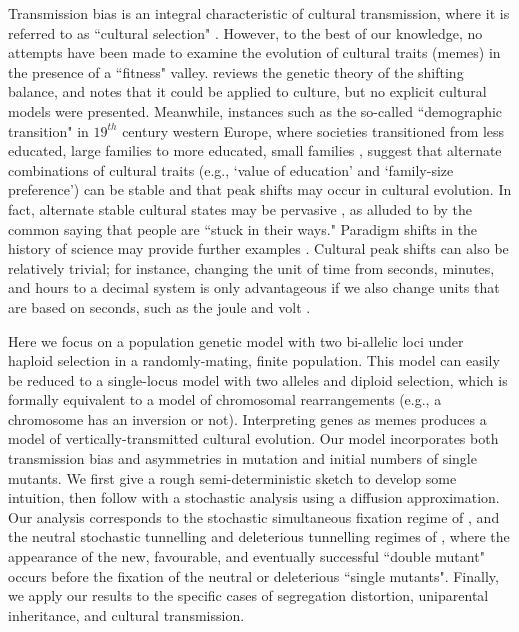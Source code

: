 \documentclass[review,3p,authoryear]{elsarticle}
\begin{document}
 Transmission bias is an integral characteristic of cultural transmission, where it is referred to as ``cultural selection" \citep{CavalliSforza1981,Boyd1985}.
However, to the best of our knowledge, no attempts have been made to examine the evolution of cultural traits (memes) in the presence of a ``fitness" valley.
\cite{Boyd2001} reviews the genetic theory of the shifting balance, and notes that it could be applied to culture, but no explicit cultural models were presented.
Meanwhile, instances such as the so-called ``demographic transition" in $19^{th}$ century western Europe, where societies transitioned from less educated, large families to more educated, small families \citep{Mulder1998}, suggest that alternate combinations of cultural traits (e.g., `value of education' and `family-size preference') can be stable and that peak shifts may occur in cultural evolution.
In fact, alternate stable cultural states may be pervasive \citep{Boyd2010}, as alluded to by the common saying that people are ``stuck in their ways."
Paradigm shifts in the history of science \citep{Kuhn1962} may provide further examples \citep{Fog1999}.
Cultural peak shifts can also be relatively trivial; for instance, changing the unit of time from seconds, minutes, and hours to a decimal system is only advantageous if we also change units that are based on seconds, such as the joule and volt \citep{Fog1999}.     

Here we focus on a population genetic model with two bi-allelic loci under haploid selection in a randomly-mating, finite population.
This model can easily be reduced to a single-locus model with two alleles and diploid selection, which is formally equivalent to a model of chromosomal rearrangements (e.g., a chromosome has an inversion or not).
Interpreting genes as memes produces a model of vertically-transmitted cultural evolution.
Our model incorporates both transmission bias and asymmetries in mutation and initial numbers of single mutants.
We first give a rough semi-deterministic sketch to develop some intuition, then follow with a stochastic analysis using a diffusion approximation.
Our analysis corresponds to the stochastic simultaneous fixation regime of \cite{Weinreich2005}, and the neutral stochastic tunnelling and deleterious tunnelling regimes of \cite{Weissman2010}, where the appearance of the new, favourable, and eventually successful ``double mutant" occurs before the fixation of the neutral or deleterious ``single mutants". 
Finally, we apply our results to the specific cases of segregation distortion, uniparental inheritance, and cultural transmission.
\end{document}
